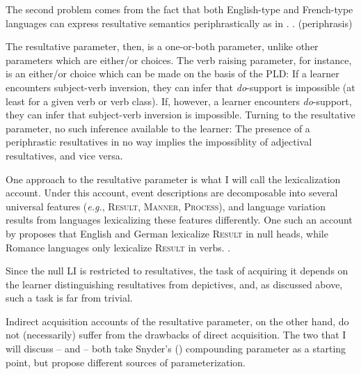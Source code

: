 \documentclass[MilwayThesis]{subfiles}
\begin{document}
The second problem comes from the fact that both English-type and French-type languages can express resultative semantics periphrastically as in \Next.
\ex. (periphrasis)

The resultative parameter, then, is a one-or-both parameter, unlike other parameters which are either/or choices.
The verb raising parameter, for instance, is an either/or choice which can be made on the basis of the PLD:
If a learner encounters subject-verb inversion, they can infer that \textit{do}-support is impossible (at least for a given verb or verb class). 
If, however, a learner encounters \textit{do}-support, they can infer that subject-verb inversion is impossible. 
Turning to the resultative parameter, no such inference available to the learner:
The presence of a periphrastic resultatives in no way implies the impossiblity of adjectival resultatives, and vice versa.

One approach to the resultative parameter is what I will call the lexicalization account.
Under this account, event descriptions are decomposable into several universal features (\textit{e.g.}, \textsc{Result}, \textsc{Manner}, \textsc{Process}), and language variation results from languages lexicalizing these features differently.
One such an account by \textcite{son2008microparameters} proposes that English and German lexicalize \textsc{Result} in null heads, while Romance languages only lexicalize \textsc{Result} in verbs.
\ex.

Since the null LI is restricted to resultatives, the task of acquiring it depends on the learner distinguishing resultatives from depictives, and, as discussed above, such a task is far from trivial.

Indirect acquisition accounts of the resultative parameter, on the other hand, do not (necessarily) suffer from the drawbacks of direct acquisition.
The two that I will discuss -- \textcite{beck2001complex} and \textcite{kratzer_building_2004} -- both take Snyder's (\citeyear{snyder1995language}) compounding parameter as a starting point, but propose different sources of parameterization.
\end{document}
